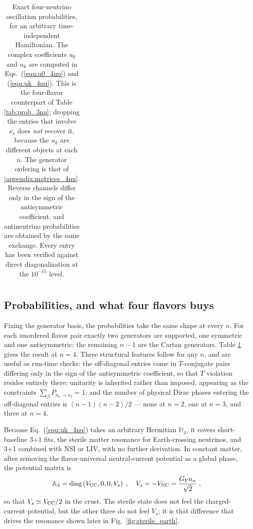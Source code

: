 \documentclass[final,5p,times,twocolumn]{elsarticle}
\newcommand{\eq}{Eq.}
\newcommand{\fig}{Fig.}
\newcommand{\equ}[1]{\eq~(\ref{equ:#1})}
\newcommand{\figu}[1]{\fig~\ref{fig:#1}}
\providecommand{\DIFaddtex}[1]{{\protect\color{blue} \sf #1}} %
\providecommand{\DIFaddFL}[1]{\DIFadd{#1}} %
\providecommand{\DIFadd}[1]{\DIFaddtex{#1}} %
\begin{document}
{\begin{table}[t!]
\begin{tabular}{lc}
  \end{tabular}
  \caption{\label{tab:prob_4nu}\DIFaddFL{Exact four-neutrino oscillation probabilities, for an arbitrary time-independent Hamiltonian.  The complex coefficients $u_0$ and $u_k$ are computed in Eqs.\ (\ref{equ:u0_4nu}) and (\ref{equ:uk_4nu}).  This is the four-flavor counterpart of Table \ref{tab:prob_3nu}; dropping the entries that involve $\nu_s$ does }\emph{\DIFaddFL{not}} \DIFaddFL{recover it, because the $u_k$ are different objects at each $n$.  The generator ordering is that of \ref{appendix:matrices_4nu}.  Reverse channels differ only in the sign of the antisymmetric coefficient, and antineutrino probabilities are obtained by the same exchange.  Every entry has been verified against direct diagonalization at the $10^{-15}$ level.}}
\end{table}
}

\subsection{\DIFadd{Probabilities, and what four flavors buys}}

\DIFadd{Fixing the generator basis, the probabilities take the same shape at every $n$.  For each unordered flavor pair exactly two generators are supported, one symmetric and one antisymmetric; the remaining $n-1$ are the Cartan generators.  Table \ref{tab:prob_4nu} gives the result at $n=4$.  Three structural features follow for any $n$, and are useful as run-time checks: the off-diagonal entries come in $T$-conjugate pairs differing only in the sign of the antisymmetric coefficient, so that $T$ violation resides entirely there; unitarity is inherited rather than imposed, appearing as the constraints $\sum_\beta P_{\nu_\alpha \to \nu_\beta} = 1$; and the number of physical Dirac phases entering the off-diagonal entries is $(n-1)(n-2)/2$ --- none at $n=2$, one at $n=3$, and three at $n=4$.
}

\DIFadd{Because \equ{uk_4nu} takes an arbitrary Hermitian $\mathbb{H}_4$, it covers short-baseline 3+1 fits, the sterile matter resonance for Earth-crossing neutrinos, and 3+1 combined with NSI or LIV, with no further derivation.  In constant matter, after removing the flavor-universal neutral-current potential as a global phase, the potential matrix is
}\begin{equation}
 \label{equ:a4}
 \mathbb{A}_4 = {\rm diag}\left(V_{\rm CC}, 0, 0, V_s\right) \;,
 \quad
 V_s = -V_{\rm NC} = \frac{G_{\rm F} n_n}{\sqrt{2}} \;,
\end{equation}
\DIFadd{so that $V_s \simeq V_{\rm CC}/2$ in the crust.  The sterile state does not feel the charged-current potential, but the other three do not feel $V_s$; it is that difference that drives the resonance shown later in \figu{sterile_earth}.
}
\end{document}
